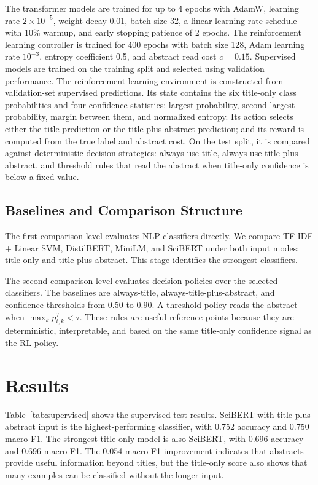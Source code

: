 \documentclass{article}
\begin{document}
The transformer models are trained for up to 4 epochs with AdamW, learning rate \(2 \times 10^{-5}\), weight decay 0.01, batch size 32, a linear learning-rate schedule with 10\% warmup, and early stopping patience of 2 epochs. The reinforcement learning controller is trained for 400 epochs with batch size 128, Adam learning rate \(10^{-3}\), entropy coefficient 0.5, and abstract read cost \(c=0.15\). Supervised models are trained on the training split and selected using validation performance. The reinforcement learning environment is constructed from validation-set supervised predictions. Its state contains the six title-only class probabilities and four confidence statistics: largest probability, second-largest probability, margin between them, and normalized entropy. Its action selects either the title prediction or the title-plus-abstract prediction; and its reward is computed from the true label and abstract cost. On the test split, it is compared against deterministic decision strategies: always use title, always use title plus abstract, and threshold rules that read the abstract when title-only confidence is below a fixed value.

\subsection{Baselines and Comparison Structure}

The first comparison level evaluates NLP classifiers directly. We compare TF-IDF + Linear SVM, DistilBERT, MiniLM, and SciBERT under both input modes: title-only and title-plus-abstract. This stage identifies the strongest classifiers.

The second comparison level evaluates decision policies over the selected classifiers. The baselines are always-title, always-title-plus-abstract, and confidence thresholds from 0.50 to 0.90. A threshold policy reads the abstract when \(\max_k p_{i,k}^T < \tau\). These rules are useful reference points because they are deterministic, interpretable, and based on the same title-only confidence signal as the RL policy.

\section{Results}

Table~\ref{tab:supervised} shows the supervised test results. SciBERT with title-plus-abstract input is the highest-performing classifier, with 0.752 accuracy and 0.750 macro F1. The strongest title-only model is also SciBERT, with 0.696 accuracy and 0.696 macro F1. The 0.054 macro-F1 improvement indicates that abstracts provide useful information beyond titles, but the title-only score also shows that many examples can be classified without the longer input.
\end{document}
